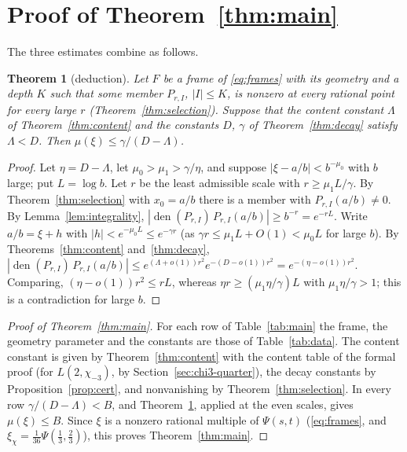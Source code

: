 \documentclass[11pt]{amsart}
\newtheorem{theorem}{Theorem}[section]
\theoremstyle{definition}
\theoremstyle{remark}
\numberwithin{equation}{section}
\newcommand{\den}{\operatorname{den}}
\begin{document}
\section{Proof of Theorem~\ref{thm:main}}\label{sec:proof}

The three estimates combine as follows.

\begin{theorem}[deduction]\label{thm:deduction}
Let $F$ be a frame of \eqref{eq:frames} with its geometry and a depth $K$ such that some member $P_{r,I}$, $|I|\le K$, is
nonzero at every rational point for every large $r$ (Theorem~\ref{thm:selection}). Suppose that the content constant
$\Lambda$ of Theorem~\ref{thm:content} and the constants $D$, $\gamma$ of Theorem~\ref{thm:decay} satisfy $\Lambda<D$. Then
$\mu(\xi)\le\gamma/(D-\Lambda)$.
\end{theorem}

\begin{proof}
Let $\eta=D-\Lambda$, let $\mu_0>\mu_1>\gamma/\eta$, and suppose $|\xi-a/b|<b^{-\mu_0}$ with $b$ large; put $L=\log b$. Let
$r$ be the least admissible scale with $r\ge\mu_1L/\gamma$. By Theorem~\ref{thm:selection} with $x_0=a/b$ there is a member
with $P_{r,I}(a/b)\ne0$. By Lemma~\ref{lem:integrality}, $|\den(P_{r,I})\,P_{r,I}(a/b)|\ge b^{-r}=e^{-rL}$.
Write $a/b=\xi+h$ with $|h|<e^{-\mu_0L}\le e^{-\gamma r}$ (as $\gamma r\le\mu_1L+O(1)<\mu_0L$ for large $b$). By
Theorems~\ref{thm:content} and~\ref{thm:decay},
$|\den(P_{r,I})\,P_{r,I}(a/b)|\le e^{(\Lambda+o(1))r^2}e^{-(D-o(1))r^2}=e^{-(\eta-o(1))r^2}$. Comparing,
$(\eta-o(1))r^2\le rL$, whereas $\eta r\ge(\mu_1\eta/\gamma)L$ with $\mu_1\eta/\gamma>1$; this is a contradiction for large
$b$.
\end{proof}

\begin{proof}[Proof of Theorem~\ref{thm:main}]
For each row of Table~\ref{tab:main} the frame, the geometry parameter and the constants are those of
Table~\ref{tab:data}. The content constant is given by Theorem~\ref{thm:content} with the content table of the formal proof
(for $L(2,\chi_{-3})$, by Section~\ref{sec:chi3-quarter}), the decay constants by Proposition~\ref{prop:cert}, and
nonvanishing by Theorem~\ref{thm:selection}. In every row $\gamma/(D-\Lambda)<B$, and Theorem~\ref{thm:deduction}, applied at
the even scales, gives $\mu(\xi)\le B$. Since $\xi$ is a nonzero rational multiple of
$\Psi(s,t)$ (\eqref{eq:frames}, and $\xi_\chi=\frac1{36}\Psi(\frac13,\frac23)$), this proves Theorem~\ref{thm:main}.
\end{proof}
\end{document}
